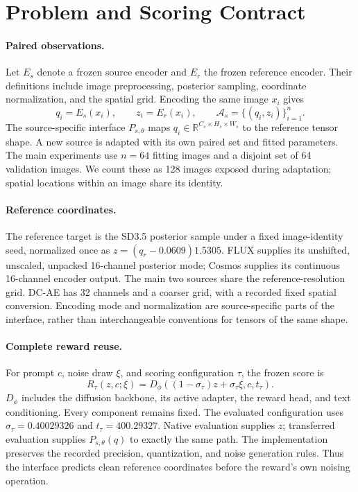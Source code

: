 \documentclass[10pt,twocolumn,letterpaper]{article}
\newcommand{\R}{\mathbb R}
\begin{document}
\section{Problem and Scoring Contract}
\label{sec:problem}
\paragraph{Paired observations.}
Let $E_s$ denote a frozen source encoder and $E_r$ the frozen reference encoder. Their definitions include image preprocessing, posterior sampling, coordinate normalization, and the spatial grid. Encoding the same image $x_i$ gives
\begin{equation}
 q_i=E_s(x_i),\qquad z_i=E_r(x_i),\qquad
 \mathcal A_s=\{(q_i,z_i)\}_{i=1}^{n}.
 \label{eq:anchors}
\end{equation}
The source-specific interface $P_{s,\theta}$ maps $q_i\in\R^{C_s\times H_s\times W_s}$ to the reference tensor shape. A new source is adapted with its own paired set and fitted parameters. The main experiments use $n=64$ fitting images and a disjoint set of 64 validation images. We count these as 128 images exposed during adaptation; spatial locations within an image share its identity.

\paragraph{Reference coordinates.}
The reference target is the SD3.5 posterior sample under a fixed image-identity seed, normalized once as $z=(q_r-0.0609)1.5305$. FLUX supplies its unshifted, unscaled, unpacked 16-channel posterior mode; Cosmos supplies its continuous 16-channel encoder output. The main two sources share the reference-resolution grid. DC-AE has 32 channels and a coarser grid, with a recorded fixed spatial conversion. Encoding mode and normalization are source-specific parts of the interface, rather than interchangeable conventions for tensors of the same shape.

\paragraph{Complete reward reuse.}
For prompt $c$, noise draw $\xi$, and scoring configuration $\tau$, the frozen score is
\begin{equation}
 R_\tau(z,c;\xi)=D_\phi((1-\sigma_\tau)z+\sigma_\tau\xi,c,t_\tau).
 \label{eq:reward}
\end{equation}
$D_\phi$ includes the diffusion backbone, its active adapter, the reward head, and text conditioning. Every component remains fixed. The evaluated configuration uses $\sigma_\tau=0.40029326$ and $t_\tau=400.29327$. Native evaluation supplies $z$; transferred evaluation supplies $P_{s,\theta}(q)$ to exactly the same path. The implementation preserves the recorded precision, quantization, and noise generation rules. Thus the interface predicts clean reference coordinates before the reward's own noising operation.
\end{document}
